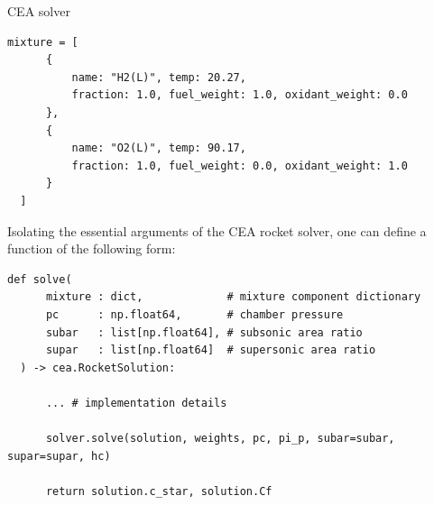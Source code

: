 \documentclass{beamer}
\begin{document}
\begin{frame}[fragile]{CEA solver}
  \begin{lstlisting}[basicstyle=\ttfamily\tiny]
  mixture = [
      {
          name: "H2(L)", temp: 20.27,
          fraction: 1.0, fuel_weight: 1.0, oxidant_weight: 0.0
      },
      {
          name: "O2(L)", temp: 90.17,
          fraction: 1.0, fuel_weight: 0.0, oxidant_weight: 1.0
      }
  ]
  \end{lstlisting}

  Isolating the essential arguments of the CEA rocket solver, one can define a
  function of the following form:

  \begin{lstlisting}[basicstyle=\ttfamily\tiny]
  def solve(
      mixture : dict,             # mixture component dictionary
      pc      : np.float64,       # chamber pressure
      subar   : list[np.float64], # subsonic area ratio
      supar   : list[np.float64]  # supersonic area ratio
  ) -> cea.RocketSolution:

      ... # implementation details

      solver.solve(solution, weights, pc, pi_p, subar=subar, supar=supar, hc)

      return solution.c_star, solution.Cf
  \end{lstlisting}
\end{frame}
\end{document}
